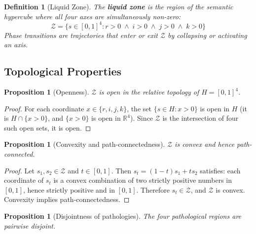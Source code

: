 \documentclass[11pt,a4paper]{article}
\newtheorem{proposition}[theorem]{Proposition}
\newtheorem{definition}[theorem]{Definition}
\newcommand{\rey}[1]{{\color{rcolor}#1}}
\newcommand{\imag}[1]{{\color{icolor}#1}}
\newcommand{\exac}[1]{{\color{jcolor}#1}}
\newcommand{\recu}[1]{{\color{kcolor}#1}}
\newcommand{\LZ}{\mathcal{Z}}
\def\rey#1{#1}%
\def\imag#1{#1}%
\def\exac#1{#1}%
\def\recu#1{#1}%
\begin{document}
\bigskip

\begin{definition}[Liquid Zone]
\label{def:liquid}
The \textbf{liquid zone} is the region of the semantic hypercube where
all four axes are simultaneously non-zero:
\begin{equation}
\LZ = \{s \in [0,1]^4 : \rey{r} > 0 \;\land\;
\imag{i} > 0 \;\land\; \exac{j} > 0 \;\land\; \recu{k} > 0\}
\end{equation}
Phase transitions are trajectories that enter or exit $\LZ$
by collapsing or activating an axis.
\end{definition}

\subsection{Topological Properties}

\begin{proposition}[Openness]
\label{prop:open}
$\LZ$ is open in the relative topology of $H = [0,1]^4$.
\end{proposition}

\begin{proof}
For each coordinate $x \in \{r, i, j, k\}$, the set $\{s \in H : x >
0\}$ is open in $H$ (it is $H \cap \{x > 0\}$, and $\{x > 0\}$ is
open in $\mathbb{R}^4$). Since $\LZ$ is the intersection of four such
open sets, it is open.
\end{proof}

\begin{proposition}[Convexity and path-connectedness]
\label{prop:convex}
$\LZ$ is convex and hence path-connected.
\end{proposition}

\begin{proof}
Let $s_1, s_2 \in \LZ$ and $t \in [0,1]$. Then $s_t = (1-t)s_1 + t
s_2$ satisfies: each coordinate of $s_t$ is a convex combination of
two strictly positive numbers in $[0,1]$, hence strictly positive and
in $[0,1]$. Therefore $s_t \in \LZ$, and $\LZ$ is convex. Convexity
implies path-connectedness.
\end{proof}

\begin{proposition}[Disjointness of pathologies]
\label{prop:disjoint}
The four pathological regions are pairwise disjoint.
\end{proposition}
\end{document}
